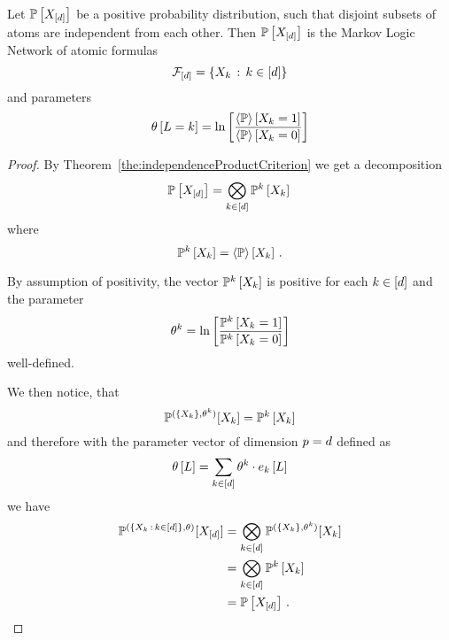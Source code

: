 \begin{theorem}\label{the:independentAtomicMLN}
	Let $\mathbb{P}\left[X_{[d]}\right]$ be a positive probability distribution, such that disjoint subsets of atoms are independent from each other.
	Then $\mathbb{P}\left[X_{[d]}\right]$ is the Markov Logic Network of atomic formulas
		\[ \mathcal{F}_{[d]} = \{X_{k} \, : \, k\in[d] \} \]
	and parameters
		\[ \theta\left[L=k\right] 
		= \ln \left[ \frac{
		\left\langle \mathbb{P}\right\rangle \left[ X_{k}=1 \right]
		}{
		\left\langle \mathbb{P}\right\rangle \left[ X_{k}=0 \right]
		} \right] \]
\end{theorem}
\begin{proof}
	
	By Theorem~\ref{the:independenceProductCriterion} we get a decomposition 
		\[ \mathbb{P}\left[X_{[d]}\right] = \bigotimes_{k\in[d]} \mathbb{P}^{k}\left[X_{k}\right] \,  \]
	where 
		\[ \mathbb{P}^{k}\left[X_{k}\right] = \left\langle \mathbb{P}\right\rangle \left[ X_{k} \right] \, . \]
	
	By assumption of positivity, the vector $\mathbb{P}^{k}\left[X_{k}\right]$ is positive for each $k\in[d]$ and the parameter
		\[ \theta^k 
		= \ln \left[ \frac{
		\mathbb{P}^{k}\left[X_{k}=1\right]
		}{
		\mathbb{P}^{k}\left[X_{k}=0\right]
		} \right] \]
	well-defined.
	
	We then notice, that 
		\[ \mathbb{P}^{(\{X_{k}\},\theta^{k})}[X_{k}] 
		= \mathbb{P}^{k}\left[X_{k}\right]\]
	and therefore with the parameter vector of dimension $p=d$ defined as
		\[ \theta\left[L\right] = \sum_{k\in[d]} \theta^{k} \cdot e_{k}\left[L\right]  \]
	we have
	\begin{align*}
	 	 \mathbb{P}^{(\{X_{k} \, : \, k\in[d]\},\theta)}[X_{[d]}] 
		& = \bigotimes_{k\in[d]} \mathbb{P}^{(\{X_{k}\},\theta^{k})}[X_{k}] \\
		& = \bigotimes_{k\in[d]} \mathbb{P}^{k}\left[X_{k}\right] \\
		& = \mathbb{P}\left[X_{[d]}\right] \, . 
	\end{align*}
\end{proof}

